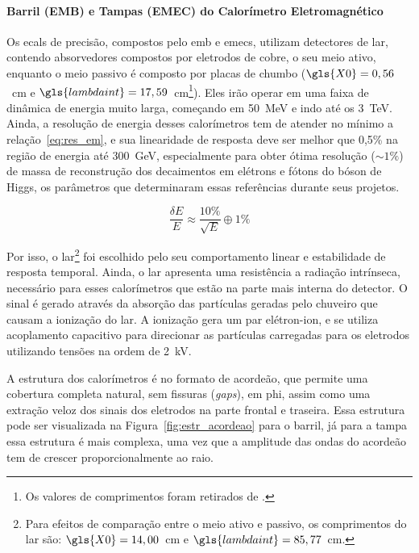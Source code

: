 \paragraph{Barril (EMB) e Tampas (EMEC) do Calorímetro Eletromagnético}
\label{par:ecal_prec}

Os \glspl{ecal} de precisão, compostos pelo \gls{emb} e \glspl{emec}, 
utilizam detectores de \gls{lar}, contendo absorvedores compostos por eletrodos 
de cobre, o seu meio ativo, enquanto o meio passivo é composto por placas de
chumbo ($\gls{X0}=0,56$~cm e $\gls{lambdaint}=17,59$~cm\footnote{Os valores de
comprimentos foram retirados de \cite{pdg_comp}.\label{fn:comp_rad_nucl}}). Eles
irão operar em uma faixa de dinâmica de energia muito larga, começando em 50~MeV
e indo até os 3~TeV. Ainda, a resolução de energia desses calorímetros tem de
atender no mínimo a relação~\ref{eq:res_em}, e sua linearidade de resposta deve ser melhor 
que 0,5\% na região de energia até 300~GeV, especialmente para obter ótima 
resolução ($\sim1\%$) de massa de reconstrução dos decaimentos em elétrons e fótons 
do bóson de Higgs, os parâmetros que determinaram essas referências durante
seus projetos. 

\begin{equation}\label{eq:res_em}
\frac{\delta E}{E} \approx \frac{10\%}{\sqrt{E}} \oplus 1\%
\end{equation}

Por isso, o \gls{lar}\footnote{Para efeitos de comparação entre o meio ativo e passivo, 
os comprimentos do \gls{lar} são: $\gls{X0}=14,00$~cm e $\gls{lambdaint}=85,77$~cm.} 
foi escolhido pelo seu comportamento linear e estabilidade de resposta temporal. 
Ainda, o \gls{lar} apresenta uma resistência a radiação intrínseca, necessário
para esses calorímetros que estão na parte mais interna do detector. O sinal é gerado
através da absorção das partículas geradas pelo chuveiro que causam a ionização
do \gls{lar}. A ionização gera um par elétron-ion, e se utiliza acoplamento
capacitivo para direcionar as partículas carregadas para os eletrodos
utilizando tensões na ordem de 2~kV.

A estrutura dos calorímetros é no formato de acordeão, que permite uma cobertura
completa natural, sem fissuras (\emph{gaps}), em \gls{phi}, assim como uma extração veloz dos sinais dos eletrodos 
na parte frontal e traseira. Essa estrutura pode ser visualizada na Figura~\ref{fig:estr_acordeao}
para o barril, já para a tampa essa estrutura é mais complexa, uma
vez que a amplitude das ondas do acordeão tem de crescer proporcionalmente ao
raio. 

